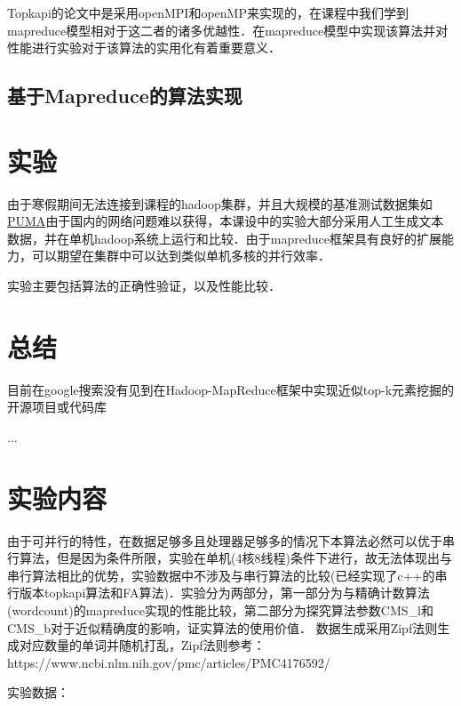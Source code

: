 \documentclass[a4paper,UTF8]{article}
\numberwithin{equation}{section}
\begin{document}
Topkapi的论文中是采用openMPI和openMP来实现的，在课程中我们学到mapreduce模型相对于这二者的诸多优越性．在mapreduce模型中实现该算法并对性能进行实验对于该算法的实用化有着重要意义．

\subsection{基于Mapreduce的算法实现}


\section{实验}

由于寒假期间无法连接到课程的hadoop集群，并且大规模的基准测试数据集如\href{https://engineering.purdue.edu/~puma/datasets.htm}{PUMA}由于国内的网络问题难以获得，本课设中的实验大部分采用人工生成文本数据，并在单机hadoop系统上运行和比较．由于mapreduce框架具有良好的扩展能力，可以期望在集群中可以达到类似单机多核的并行效率．

实验主要包括算法的正确性验证，以及性能比较．

\section{总结}

目前在google搜索没有见到在Hadoop-MapReduce框架中实现近似top-k元素挖掘的开源项目或代码库

...

\section{实验内容}
由于可并行的特性，在数据足够多且处理器足够多的情况下本算法必然可以优于串行算法，但是因为条件所限，实验在单机(4核8线程)条件下进行，故无法体现出与串行算法相比的优势，实验数据中不涉及与串行算法的比较(已经实现了c++的串行版本topkapi算法和FA算法)．实验分为两部分，第一部分为与精确计数算法(wordcount)的mapreduce实现的性能比较，第二部分为探究算法参数CMS\_l和CMS\_b对于近似精确度的影响，证实算法的使用价值．
数据生成采用Zipf法则生成对应数量的单词并随机打乱，Zipf法则参考：
https://www.ncbi.nlm.nih.gov/pmc/articles/PMC4176592/

实验数据：
\end{document}
